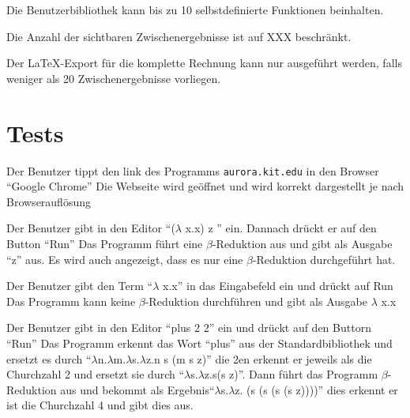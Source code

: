 \documentclass[parskip=full,11pt,twoside]{scrartcl}
\begin{document}
Die Benutzerbibliothek kann bis zu 10 selbstdefinierte Funktionen beinhalten.

Die Anzahl der sichtbaren Zwischenergebnisse ist auf XXX beschränkt.

Der LaTeX-Export für die komplette Rechnung kann nur ausgeführt werden, falls weniger als 20 Zwischenergebnisse vorliegen.



\section{Tests}


{Der Benutzer tippt den link des Programms \texttt{aurora.kit.edu} in den Browser \enquote {Google Chrome} }
{ Die Webseite wird geöffnet und wird korrekt dargestellt je nach Browserauflösung}

{ Der Benutzer gibt in den Editor \enquote {($\lambda$ x.x) z } ein. Dannach drückt er auf den Button \enquote {Run}}
{ Das Programm führt eine $\beta$-Reduktion aus und gibt als Ausgabe \enquote {z} aus. Es wird auch angezeigt, dass es nur eine $\beta$-Reduktion durchgeführt hat.}

{Der Benutzer gibt den Term \enquote {$\lambda$ x.x} in das Eingabefeld ein und drückt auf Run}
{Das Programm kann keine $\beta$-Reduktion durchführen und gibt als Ausgabe $\lambda$ x.x}

{Der Benutzer gibt in den Editor \enquote {plus 2 2} ein und drückt auf den Buttorn \enquote {Run}}
{ Das Programm erkennt das Wort \enquote {plus} aus der Standardbibliothek und ersetzt es durch \enquote {$\lambda$n.$\lambda$m.$\lambda$s.$\lambda$z.n s (m s z)} die 2en erkennt er jeweils als die Churchzahl 2 und ersetzt sie durch \enquote {$\lambda$s.$\lambda$z.s(s z)}. Dann führt das Programm $\beta$-Reduktion aus und bekommt als Ergebnis\enquote {$\lambda$s.$\lambda$z. (s (s (s (s z))))} dies erkennt er ist die Churchzahl 4 und gibt dies aus. }
\end{document}
